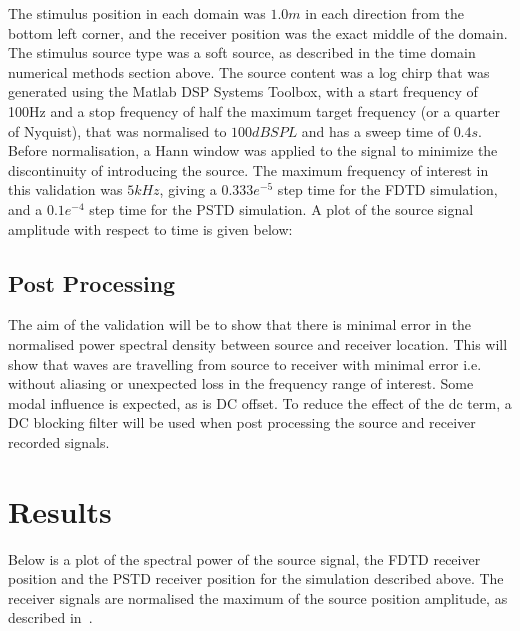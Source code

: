 The stimulus position in each domain was $1.0m$ in each direction from the bottom left corner, and the receiver position was the exact middle of the domain. The stimulus source type was a soft source, as described in the time domain numerical methods section above. The source content was a log chirp that was generated using the Matlab DSP Systems Toolbox, with a start frequency of 100Hz and a stop frequency of half the maximum target frequency (or a quarter of Nyquist), that was normalised to $100dBSPL$ and has a sweep time of $0.4s$. Before normalisation, a Hann window was applied to the signal to minimize the discontinuity of introducing the source. The maximum frequency of interest in this validation was $5kHz$, giving a $0.333e^{-5}$ step time for the FDTD simulation, and a $0.1e^{-4}$ step time for the PSTD simulation. A plot of the source signal amplitude with respect to time is given below:\\

\subsection{Post Processing}
The aim of the validation will be to show that there is minimal error in the normalised power spectral density between source and receiver location. This will show that waves are travelling from source to receiver with minimal error i.e. without aliasing or unexpected loss in the frequency range of interest. Some modal influence is expected, as is DC offset. To reduce the effect of the dc term, a DC blocking filter will be used when post processing the source and receiver recorded signals.

\section{Results}
Below is a plot of the spectral power of the source signal, the FDTD receiver position and the PSTD receiver position for the simulation described above. The receiver signals are normalised the maximum of the source position amplitude, as described in~\cite{Murphy2014}.\\ 


